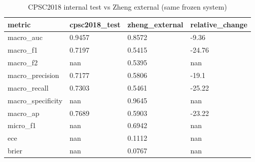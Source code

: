 \begin{table}[htbp]\centering\small
\caption{CPSC2018 internal test vs Zheng external (same frozen system)}\label{tab:cpscext}
\begin{tabular}{llll}
\hline
metric & cpsc2018_test & zheng_external & relative_change \\
\hline
macro_auc & 0.9457 & 0.8572 & -9.36 \\
macro_f1 & 0.7197 & 0.5415 & -24.76 \\
macro_f2 & nan & 0.5395 & nan \\
macro_precision & 0.7177 & 0.5806 & -19.1 \\
macro_recall & 0.7303 & 0.5461 & -25.22 \\
macro_specificity & nan & 0.9645 & nan \\
macro_ap & 0.7689 & 0.5903 & -23.22 \\
micro_f1 & nan & 0.6942 & nan \\
ece & nan & 0.1112 & nan \\
brier & nan & 0.0767 & nan \\
\hline
\end{tabular}
\end{table}
